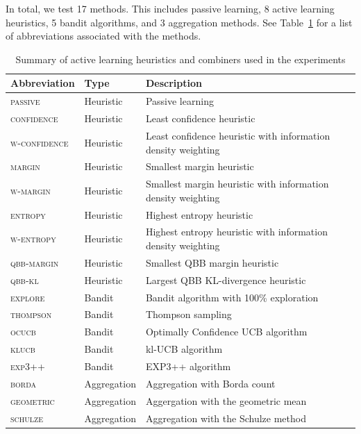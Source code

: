 \documentclass[fleqn,10pt,lineno]{wlpeerj} %
\begin{document}
In total, we test 17 methods. This includes passive learning, 8 active learning
heuristics, 5 bandit algorithms, and 3 aggregation methods. See
Table~\ref{tab:abbre} for a list of abbreviations associated with the methods.
\begin{table}[htbp]
	\caption {Summary of active learning heuristics and combiners used
	in the experiments} \label{tab:abbre}
	\centering
	\begin{tabular}{lll}
		\toprule
		Abbreviation & Type  & Description \\
		\midrule
        \textsc{passive}
        	& Heuristic & Passive learning \\
		\textsc{confidence}
			& Heuristic & Least confidence heuristic \\
		\textsc{w-confidence}
        	& Heuristic & Least confidence heuristic with information density weighting \\
        \textsc{margin}
        	& Heuristic & Smallest margin heuristic \\
        \textsc{w-margin}
        	& Heuristic & Smallest margin heuristic with information density weighting \\
        \textsc{entropy}
        	& Heuristic & Highest entropy heuristic \\
		\textsc{w-entropy}
        	& Heuristic & Highest entropy heuristic with information density weighting \\
        \textsc{qbb-margin}
        	& Heuristic & Smallest QBB margin heuristic \\
		\textsc{qbb-kl}
        	& Heuristic & Largest QBB KL-divergence heuristic \\
        \textsc{explore}
			& Bandit & Bandit algorithm with 100\% exploration \\
		\textsc{thompson}
        	& Bandit & Thompson sampling \\
		\textsc{ocucb}
			& Bandit & Optimally Confidence UCB algorithm \\
		\textsc{klucb}
			& Bandit & kl-UCB algorithm \\
		\textsc{exp3++}
			& Bandit & EXP3++ algorithm \\
		\textsc{borda}
			& Aggregation & Aggregation with Borda count \\
		\textsc{geometric}
			& Aggregation & Aggergation with the geometric mean \\
		\textsc{schulze}
			& Aggregation & Aggregation with the Schulze method \\
		\bottomrule
	\end{tabular}
\end{table}
\end{document}
